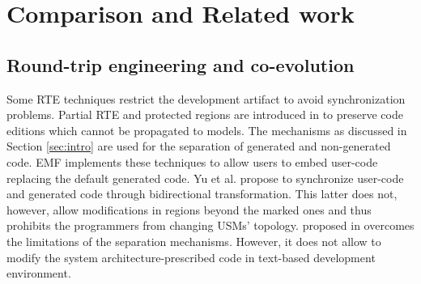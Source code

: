 \section{Comparison and Related work}
\label{sec:relatedwork}

\subsection{Round-trip engineering and co-evolution}
Some RTE techniques restrict the development artifact to avoid
synchronization problems.
Partial RTE and protected regions are introduced in \cite{czarnecki_multi-level_2006} to preserve code editions which cannot be propagated to models.
The mechanisms as discussed in Section \ref{sec:intro} are used for the separation of generated and non-generated code. 
EMF implements these techniques to allow users to embed user-code replacing the default generated code.
Yu et al. \cite{yu2012maintaining} propose to synchronize user-code and generated code through bidirectional transformation.
This latter does not, however, allow modifications in regions beyond the marked ones and thus prohibits the programmers from changing USMs' topology.
 proposed in \cite{zheng2012enhancing} overcomes the limitations of the separation mechanisms.
However, %
it does not allow to modify the system architecture-prescribed code in text-based development environment.  


